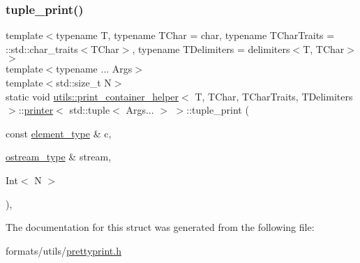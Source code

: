 \subsubsection{\texorpdfstring{tuple\_print()}{tuple\_print()}\hspace{0.1cm}{\footnotesize\ttfamily [3/3]}}
{\footnotesize\ttfamily template$<$typename T, typename T\+Char = char, typename T\+Char\+Traits = \+::std\+::char\+\_\+traits$<$\+T\+Char$>$, typename T\+Delimiters = delimiters$<$\+T, T\+Char$>$$>$ \\
template$<$typename ... Args$>$ \\
template$<$std\+::size\+\_\+t N$>$ \\
static void \mbox{\hyperlink{structutils_1_1print__container__helper}{utils\+::print\+\_\+container\+\_\+helper}}$<$ T, T\+Char, T\+Char\+Traits, T\+Delimiters $>$\+::\mbox{\hyperlink{structutils_1_1print__container__helper_1_1printer}{printer}}$<$ std\+::tuple$<$ Args... $>$ $>$\+::tuple\+\_\+print (\begin{DoxyParamCaption}\item[{const \mbox{\hyperlink{structutils_1_1print__container__helper_1_1printer_3_01std_1_1tuple_3_01_args_8_8_8_01_4_01_4_a1ca86cb16c37518fb257879ce8026459}{element\+\_\+type}} \&}]{c,  }\item[{\mbox{\hyperlink{structutils_1_1print__container__helper_1_1printer_3_01std_1_1tuple_3_01_args_8_8_8_01_4_01_4_a7a89933fa31d7a79f454cdf36211a73a}{ostream\+\_\+type}} \&}]{stream,  }\item[{Int$<$ N $>$}]{ }\end{DoxyParamCaption})\hspace{0.3cm}{\ttfamily [inline]}, {\ttfamily [static]}}



The documentation for this struct was generated from the following file\+:\begin{DoxyCompactItemize}
\item 
formats/utils/\mbox{\hyperlink{prettyprint_8h}{prettyprint.\+h}}\end{DoxyCompactItemize}
